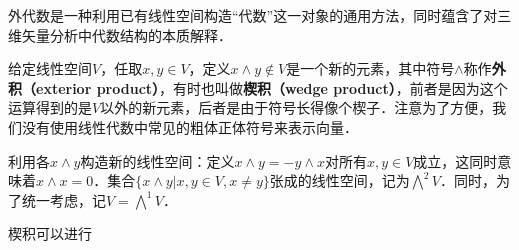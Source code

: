 

外代数是一种利用已有线性空间构造“代数”这一对象的通用方法，同时蕴含了对三维矢量分析中代数结构的本质解释．


给定线性空间$V$，任取$x, y\in V$，定义$x\wedge y\not\in V$是一个新的元素，其中符号$\wedge$称作\textbf{外积（exterior product）}，有时也叫做\textbf{楔积（wedge product）}，前者是因为这个运算得到的是$V$以外的新元素，后者是由于符号长得像个楔子．注意为了方便，我们没有使用线性代数中常见的粗体正体符号来表示向量．

利用各$x\wedge y$构造新的线性空间：定义$x\wedge y=-y\wedge x$对所有$x, y\in V$成立，这同时意味着$x\wedge x=0$．集合$\{x\wedge y|x, y\in V, x\not=y\}$张成的线性空间，记为$\bigwedge^2 V$．同时，为了统一考虑，记$V=\bigwedge^1 V$．

楔积可以进行
